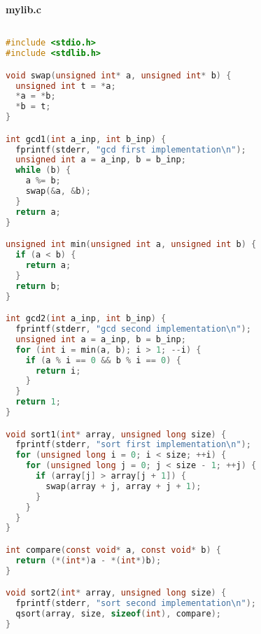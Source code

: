 \textbf{mylib.c}

\begin{lstlisting}[language=C]

#include <stdio.h>
#include <stdlib.h>

void swap(unsigned int* a, unsigned int* b) {
  unsigned int t = *a;
  *a = *b;
  *b = t;
}

int gcd1(int a_inp, int b_inp) {
  fprintf(stderr, "gcd first implementation\n");
  unsigned int a = a_inp, b = b_inp;
  while (b) {
    a %= b;
    swap(&a, &b);
  }
  return a;
}

unsigned int min(unsigned int a, unsigned int b) {
  if (a < b) {
    return a;
  }
  return b;
}

int gcd2(int a_inp, int b_inp) {
  fprintf(stderr, "gcd second implementation\n");
  unsigned int a = a_inp, b = b_inp;
  for (int i = min(a, b); i > 1; --i) {
    if (a % i == 0 && b % i == 0) {
      return i;
    }
  }
  return 1;
}

void sort1(int* array, unsigned long size) {
  fprintf(stderr, "sort first implementation\n");
  for (unsigned long i = 0; i < size; ++i) {
    for (unsigned long j = 0; j < size - 1; ++j) {
      if (array[j] > array[j + 1]) {
        swap(array + j, array + j + 1);
      }
    }
  }
}

int compare(const void* a, const void* b) {
  return (*(int*)a - *(int*)b);
}

void sort2(int* array, unsigned long size) {
  fprintf(stderr, "sort second implementation\n");
  qsort(array, size, sizeof(int), compare);
}

\end{lstlisting}

\pagebreak
